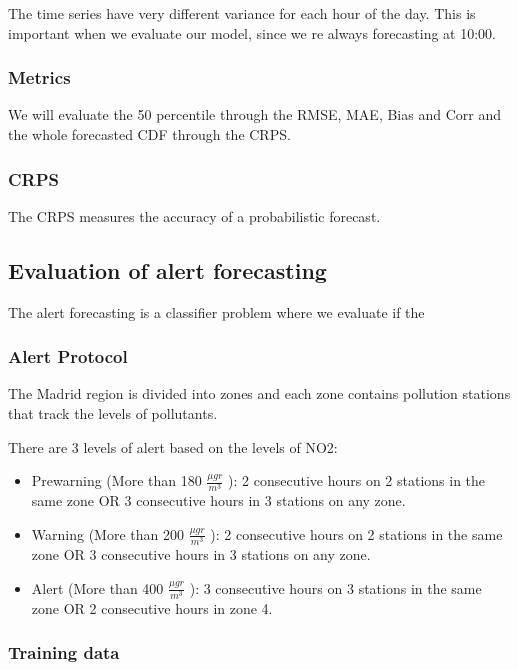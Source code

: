 \documentclass[a4paper,twocolumn,5p]{elsarticle}
\begin{document}
The time series have very different variance for each hour of the day. This is important when we evaluate our model, since
we re always forecasting at 10:00.

\subsubsection{Metrics}

We will evaluate the 50 percentile through the RMSE, MAE, Bias and Corr and the whole forecasted CDF through the CRPS.

\subsubsection{CRPS}
\label{sec:eval-extr-value}

The CRPS measures the accuracy of a probabilistic forecast. 

\subsection{Evaluation of alert forecasting}
\label{sec:eval-extr-value}

The alert forecasting is a classifier problem where we evaluate if the 

\subsubsection{Alert Protocol}

The Madrid region is divided into zones and each zone contains pollution stations that track the levels
of pollutants.

There are 3 levels of alert based on the levels of NO2:
\begin{itemize}
  \item Prewarning (More than 180 $\frac{\mu gr}{m^3}$ ): 2 consecutive hours on 2 stations in the same zone OR 3 
  consecutive hours in 3 stations on any zone.
  \item Warning (More than 200 $\frac{\mu gr}{m^3}$ ): 2 consecutive hours on 2 stations in the same zone OR 3 
  consecutive hours in 3 stations on any zone.
  \item Alert (More than 400 $\frac{\mu gr}{m^3}$ ): 3 consecutive hours on 3 stations in the same zone OR 2 
  consecutive hours in zone 4. 
\end{itemize} 

\subsubsection{Training data}
\label{sec:eval-extr-value}
\end{document}
